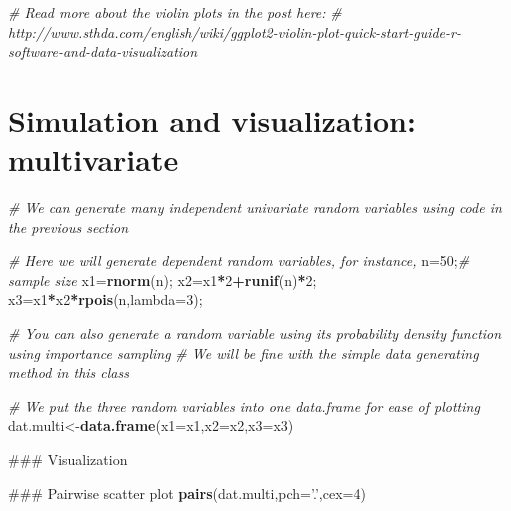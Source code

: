 \documentclass[12pt,]{book}
\newenvironment{Shaded}{\begin{snugshade}}{\end{snugshade}}
\newcommand{\KeywordTok}[1]{\textcolor[rgb]{0.13,0.29,0.53}{\textbf{#1}}}
\newcommand{\DataTypeTok}[1]{\textcolor[rgb]{0.13,0.29,0.53}{#1}}
\newcommand{\DecValTok}[1]{\textcolor[rgb]{0.00,0.00,0.81}{#1}}
\newcommand{\StringTok}[1]{\textcolor[rgb]{0.31,0.60,0.02}{#1}}
\newcommand{\CommentTok}[1]{\textcolor[rgb]{0.56,0.35,0.01}{\textit{#1}}}
\newcommand{\OperatorTok}[1]{\textcolor[rgb]{0.81,0.36,0.00}{\textbf{#1}}}
\newcommand{\NormalTok}[1]{#1}
\begin{document}
\begin{Shaded}
\begin{Highlighting}[]
\CommentTok{# Read more about the violin plots in the post here:}
\CommentTok{# http://www.sthda.com/english/wiki/ggplot2-violin-plot-quick-start-guide-r-software-and-data-visualization}
\end{Highlighting}
\end{Shaded}

\section{Simulation and visualization:
multivariate}\label{simulation-and-visualization-multivariate}

\begin{Shaded}
\begin{Highlighting}[]
\CommentTok{# We can generate many independent univariate random variables using code in the previous section }

\CommentTok{# Here we will generate dependent random variables, for instance, }
\NormalTok{n=}\DecValTok{50}\NormalTok{;}\CommentTok{# sample size}
\NormalTok{x1=}\KeywordTok{rnorm}\NormalTok{(n);}
\NormalTok{x2=x1}\OperatorTok{*}\DecValTok{2}\OperatorTok{+}\KeywordTok{runif}\NormalTok{(n)}\OperatorTok{*}\DecValTok{2}\NormalTok{;}
\NormalTok{x3=x1}\OperatorTok{*}\NormalTok{x2}\OperatorTok{*}\KeywordTok{rpois}\NormalTok{(n,}\DataTypeTok{lambda=}\DecValTok{3}\NormalTok{);}

\CommentTok{# You can also generate a random variable using its probability density function using importance sampling}
\CommentTok{# We will be fine with the simple data generating method in this class }

\CommentTok{# We put the three random variables into one data.frame for ease of plotting }
\NormalTok{dat.multi<-}\KeywordTok{data.frame}\NormalTok{(}\DataTypeTok{x1=}\NormalTok{x1,}\DataTypeTok{x2=}\NormalTok{x2,}\DataTypeTok{x3=}\NormalTok{x3)}
\end{Highlighting}
\end{Shaded}

\begin{Shaded}
\begin{Highlighting}[]
\NormalTok{### Visualization}

\NormalTok{### Pairwise scatter plot}
\KeywordTok{pairs}\NormalTok{(dat.multi,}\DataTypeTok{pch=}\StringTok{'.'}\NormalTok{,}\DataTypeTok{cex=}\DecValTok{4}\NormalTok{)}
\end{Highlighting}
\end{Shaded}
\end{document}

